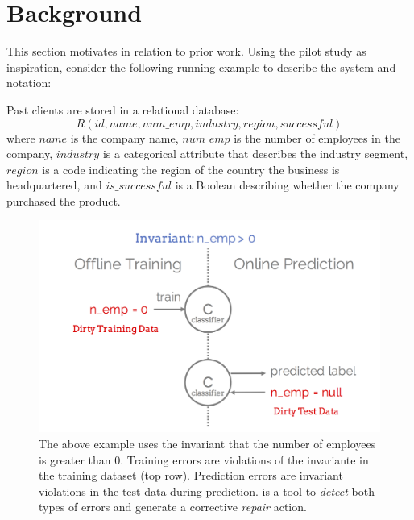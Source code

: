 
\section{Background}
This section motivates \sys in relation to prior work.
Using the pilot study as inspiration, consider the following running example to describe the system and notation:

\begin{example}\sloppy\label{ex:lead}
Past clients are stored in a relational database:
\[
R(id, name, num\_emp, industry, region, successful)
\]
where $name$ is the company name, $num\_emp$ is the number of employees in the company, $industry$ is a categorical attribute that describes the industry segment, $region$ is a code indicating the region of the country the business is headquartered, and $is\_successful$ is a Boolean describing whether the company purchased the product.
\end{example}

\begin{figure}[t]
\centering
 \includegraphics[width=\columnwidth]{figures/training_and_pred_errors.png}
 \caption{The above example uses the invariant that the number of employees is greater than $0$.  Training errors are violations of the invariante in the training dataset (top row). Prediction errors are invariant violations in the test data during prediction. \sys is a tool to {\it detect} both types of errors and generate a corrective {\it repair} action.
 \label{fig:error}}
\end{figure}

